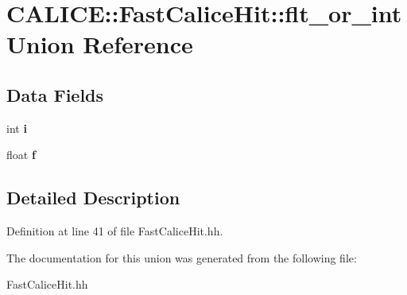 \section{CALICE::FastCaliceHit::flt\_\-or\_\-int Union Reference}
\label{unionCALICE_1_1FastCaliceHit_1_1flt__or__int}
\subsection*{Data Fields}
\begin{DoxyCompactItemize}
\item 
int {\bfseries i}\label{unionCALICE_1_1FastCaliceHit_1_1flt__or__int_ab600d412d91497cfd4279e1133cd5045}

\item 
float {\bfseries f}\label{unionCALICE_1_1FastCaliceHit_1_1flt__or__int_adf2a843f43384add37cef4f180b7735a}

\end{DoxyCompactItemize}


\subsection{Detailed Description}


Definition at line 41 of file FastCaliceHit.hh.

The documentation for this union was generated from the following file:\begin{DoxyCompactItemize}
\item 
FastCaliceHit.hh\end{DoxyCompactItemize}
